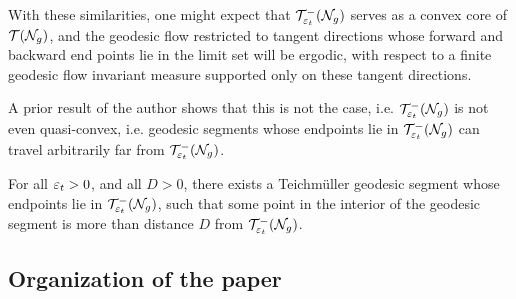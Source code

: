 With these similarities, one might expect that $\mathcal{T}_{\varepsilon_t}^{-}(\mathcal{N}_g)$ serves as a convex core of $\mathcal{T}(\mathcal{N}_g)$, and the geodesic flow restricted to tangent directions whose forward and backward end points lie in the limit set will be ergodic, with respect to a finite geodesic flow invariant measure supported only on these tangent directions.

A prior result of the author shows that this is not the case, i.e. $\mathcal{T}_{\varepsilon_t}^{-}(\mathcal{N}_g)$ is not even quasi-convex, i.e. geodesic segments whose endpoints lie in $\mathcal{T}_{\varepsilon_t}^{-}(\mathcal{N}_g)$ can travel arbitrarily far from $\mathcal{T}_{\varepsilon_t}^{-}(\mathcal{N}_g)$.

\begin{theorem}
  For all $\varepsilon_t > 0$, and all $D > 0$, there exists a Teichmüller geodesic segment whose endpoints lie in $\mathcal{T}_{\varepsilon_t}^{-}(\mathcal{N}_g)$, such that some point in the interior of the geodesic segment is more than distance $D$ from $\mathcal{T}_{\varepsilon_t}^{-}(\mathcal{N}_g)$.
\end{theorem}

\subsection*{Organization of the paper}


\tableofcontents


